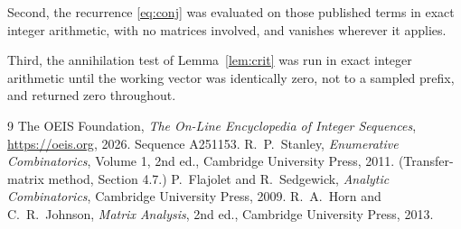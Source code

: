 \documentclass[11pt,a4paper]{article}
\theoremstyle{plain}
\theoremstyle{definition}
\begin{document}
Second, the recurrence \eqref{eq:conj} was evaluated on those published terms in exact
integer arithmetic, with no matrices involved, and vanishes wherever it applies.

Third, the annihilation test of Lemma~\ref{lem:crit} was run in exact integer arithmetic
until the working vector was identically zero, not to a sampled prefix, and returned zero
throughout.

\begin{thebibliography}{9}
 The OEIS Foundation, \emph{The On-Line Encyclopedia of Integer
Sequences}, \url{https://oeis.org}, 2026. Sequence A251153.
 R.~P.~Stanley, \emph{Enumerative Combinatorics}, Volume 1, 2nd ed.,
Cambridge University Press, 2011. (Transfer-matrix method, Section 4.7.)
 P.~Flajolet and R.~Sedgewick, \emph{Analytic Combinatorics}, Cambridge
University Press, 2009.
 R.~A.~Horn and C.~R.~Johnson, \emph{Matrix Analysis}, 2nd ed., Cambridge
University Press, 2013.
\end{thebibliography}
\end{document}
